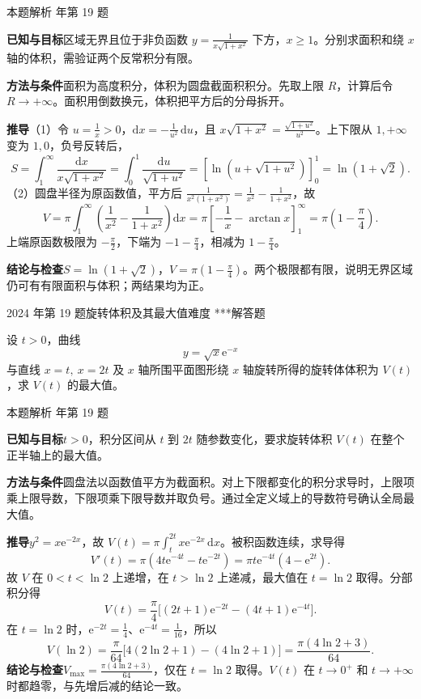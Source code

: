 \documentclass[UTF8,zihao=-4,fontset=fandol]{ctexart}
\newcounter{BankQuestion}
\newcommand{\QuestionPage}[7]{%
  \stepcounter{BankQuestion}%
  \par\noindent\begin{minipage}{\linewidth}
  \raggedright
  {\small\textcolor{black!60}{#3\quad #5\quad 难度 #7}\hfill\textcolor{accent}{#2}}\par\smallskip}
\newcommand{\QuestionEnd}{\end{minipage}\par\medskip}
\newcommand{\QuestionPage}[7]{%
  \clearpage
  \stepcounter{BankQuestion}%
  {\small\textcolor{accent}{#1\hfill #2}}\par\medskip
  {\small\textcolor{black!60}{#3\quad #5\quad 难度 #7\hfill \arabic{BankQuestion} / 234}}\par\vspace{9bp}}
\newcommand{\QuestionEnd}{}
\newenvironment{QuestionSolution}[1]{%
  \clearpage
  {\small\textcolor{black!60}{本题解析\quad #1}}\par\medskip
}{\par\clearpage}
\begin{document}
\begin{QuestionSolution}{2023 年第 19 题}
\textbf{已知与目标}\quad 区域无界且位于非负函数 \(y=\frac{1}{x\sqrt{1+x^2}}\) 下方，\(x\ge1\)。分别求面积和绕 \(x\) 轴的体积，需验证两个反常积分有限。

\textbf{方法与条件}\quad 面积为高度积分，体积为圆盘截面积积分。先取上限 \(R\)，计算后令 \(R\to+\infty\)。面积用倒数换元，体积把平方后的分母拆开。

\textbf{推导}\quad （1）令 \(u=\frac{1}{x}>0\)，\(\mathrm{d}x=-\frac{1}{u^2}\,\mathrm{d}u\)，且 \(x\sqrt{1+x^2}=\frac{\sqrt{1+u^2}}{u^2}\)。上下限从 \(1,+\infty\) 变为 \(1,0\)，负号反转后，
\[
S=\int_1^\infty\frac{\mathrm{d}x}{x\sqrt{1+x^2}}
=\int_0^1\frac{\mathrm{d}u}{\sqrt{1+u^2}}
=\left[\ln(u+\sqrt{1+u^2})\right]_0^1
=\boxed{\ln(1+\sqrt2)}.
\]
（2）圆盘半径为原函数值，平方后 \(\frac{1}{x^2(1+x^2)}=\frac{1}{x^2}-\frac{1}{1+x^2}\)，故
\[
V=\pi\int_1^\infty\left(\frac1{x^2}-\frac1{1+x^2}\right)\mathrm{d}x
=\pi\left[-\frac1x-\arctan x\right]_1^\infty
=\boxed{\pi\left(1-\frac\pi4\right)} .
\]
上端原函数极限为 \(-\frac{\pi}{2}\)，下端为 \(-1-\frac{\pi}{4}\)，相减为 \(1-\frac{\pi}{4}\)。

\textbf{结论与检查}\quad \(\boxed{S=\ln(1+\sqrt2)}\)，\(\boxed{V=\pi(1-\frac{\pi}{4})}\)。两个极限都有限，说明无界区域仍可有有限面积与体积；两结果均为正。
\end{QuestionSolution}

\QuestionPage{3.4 定积分的应用}{解答题}{2024 年第 19 题}{3}{旋转体积及其最大值}{187 / 234}{***}
设 \(t>0\)，曲线
\[y=\sqrt{x}\mathrm{e}^{-x}
\]
与直线 \(x=t,\ x=2t\) 及 \(x\) 轴所围平面图形绕 \(x\) 轴旋转所得的旋转体体积为 \(V(t)\)，求 \(V(t)\) 的最大值。
\QuestionEnd

\begin{QuestionSolution}{2024 年第 19 题}
\textbf{已知与目标}\quad \(t>0\)，积分区间从 \(t\) 到 \(2t\) 随参数变化，要求旋转体积 \(V(t)\) 在整个正半轴上的最大值。

\textbf{方法与条件}\quad 圆盘法以函数值平方为截面积。对上下限都变化的积分求导时，上限项乘上限导数，下限项乘下限导数并取负号。通过全定义域上的导数符号确认全局最大值。

\textbf{推导}\quad \(y^2=x\mathrm{e}^{-2x}\)，故 \(V(t)=\pi\int_t^{2t}x\mathrm{e}^{-2x}\,\mathrm{d}x\)。被积函数连续，求导得
\[
V'(t)=\pi(4t\mathrm{e}^{-4t}-t\mathrm{e}^{-2t})
=\pi t\mathrm{e}^{-4t}(4-\mathrm{e}^{2t}).
\]
故 \(V\) 在 \(0<t<\ln2\) 上递增，在 \(t>\ln2\) 上递减，最大值在 \(t=\ln2\) 取得。分部积分得
\[
V(t)=\frac{\pi}{4}\bigl[(2t+1)\mathrm{e}^{-2t}-(4t+1)\mathrm{e}^{-4t}\bigr].
\]
在 \(t=\ln2\) 时，\(\mathrm{e}^{-2t}=\frac{1}{4}\)、\(\mathrm{e}^{-4t}=\frac{1}{16}\)，所以
\[
V(\ln2)=\frac{\pi}{64}\bigl[4(2\ln2+1)-(4\ln2+1)\bigr]
=\frac{\pi(4\ln2+3)}{64}.
\]
\textbf{结论与检查}\quad \(\boxed{V_{\max}=\frac{\pi(4\ln2+3)}{64}}\)，仅在 \(t=\ln2\) 取得。\(V(t)\) 在 \(t\to0^+\) 和 \(t\to+\infty\) 时都趋零，与先增后减的结论一致。
\end{QuestionSolution}
\end{document}
